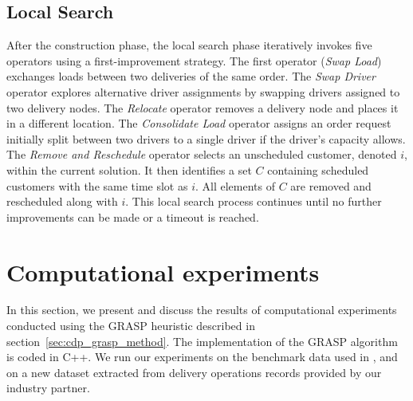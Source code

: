 \subsection{Local Search}

After the construction phase, the local search phase iteratively invokes five operators using a first-improvement strategy. The first operator (\textit{Swap Load}) exchanges loads between two deliveries of the same order. The \textit{Swap Driver} operator explores alternative driver assignments by swapping drivers assigned to two delivery nodes. The \textit{Relocate} operator removes a delivery node and places it in a different location. The \textit{Consolidate Load} operator assigns an order request initially split between two drivers to a single driver if the driver's capacity allows. The \textit{Remove and Reschedule} operator selects an unscheduled customer, denoted $i$, within the current solution. It then identifies a set $C$ containing scheduled customers with the same time slot as $i$. All elements of $C$ are removed and rescheduled along with $i$. This local search process continues until no further improvements can be made or a timeout is reached.




\section{Computational experiments}
\label{sec:cdp_comp_exp}

In this section, we present and discuss the results of computational experiments conducted using the GRASP heuristic described in section~\ref{sec:cdp_grasp_method}. The implementation of the GRASP algorithm is coded in C++. We run our experiments on the benchmark data used in \cite{kinable2014concrete}, and on a new dataset extracted from delivery operations records provided by our industry partner.

